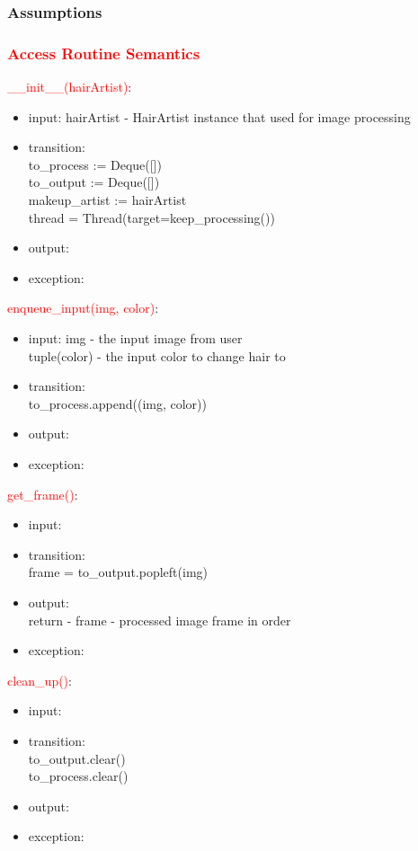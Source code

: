 \documentclass[12pt, titlepage]{article}
\begin{document}
\subsubsection{Assumptions}

\subsubsection{\textcolor{red}{Access Routine Semantics}}
\noindent 
\textcolor{red}{\_\_init\_\_(hairArtist)}:
\begin{itemize}
\item input: hairArtist - HairArtist instance that used for image processing  \\
\item transition: \\
to\_process := Deque([])\\ 
to\_output := Deque([]) \\
makeup\_artist := hairArtist \\
thread = Thread(target=keep\_processing())
\item output:
\item exception:
\end{itemize}

\noindent 
\textcolor{red}{enqueue\_input(img, color)}:
\begin{itemize}
\item input: img - the input image from user  \\
tuple(color) - the input color to change hair to
\item transition: \\
to\_process.append((img, color))
\item output:
\item exception:
\end{itemize}

\noindent 
\textcolor{red}{get\_frame()}:
\begin{itemize}
\item input:
\item transition: \\
frame = to\_output.popleft(img)
\item output:\\
return - frame - processed image frame in order
\item exception:
\end{itemize}


\noindent 
\textcolor{red}{clean\_up()}:
\begin{itemize}
\item input:
\item transition: \\
to\_output.clear()\\ 
to\_process.clear() 
\item output:
\item exception:
\end{itemize}
\end{document}
